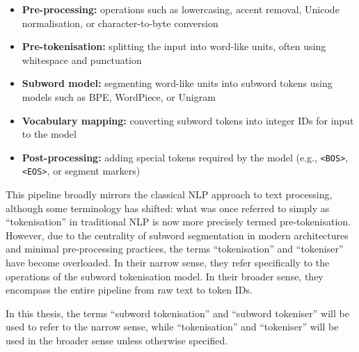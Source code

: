 \begin{itemize}
\item \textbf{Pre-processing:} operations such as lowercasing, accent removal, Unicode normalisation, or character-to-byte conversion
\item \textbf{Pre-tokenisation:} splitting the input into word-like units, often using whitespace and punctuation
\item \textbf{Subword model:} segmenting word-like units into subword tokens using models such as BPE, WordPiece, or Unigram
\item \textbf{Vocabulary mapping:} converting subword tokens into integer IDs for input to the model
\item \textbf{Post-processing:} adding special tokens required by the model (e.g., \texttt{<BOS>}, \texttt{<EOS>}, or segment markers)
\end{itemize}

This pipeline broadly mirrors the classical NLP approach to text processing, although some terminology has shifted: what was once referred to simply as “tokenisation” in traditional NLP is now more precisely termed pre-tokenisation. However, due to the centrality of subword segmentation in modern architectures and minimal pre-processing practices, the terms “tokenisation” and “tokeniser” have become overloaded. In their narrow sense, they refer specifically to the operations of the subword tokenisation model. In their broader sense, they encompass the entire pipeline from raw text to token IDs.

In this thesis, the terms “subword tokenisation” and “subword tokeniser” will be used to refer to the narrow sense, while “tokenisation” and “tokeniser” will be used in the broader sense unless otherwise specified.


